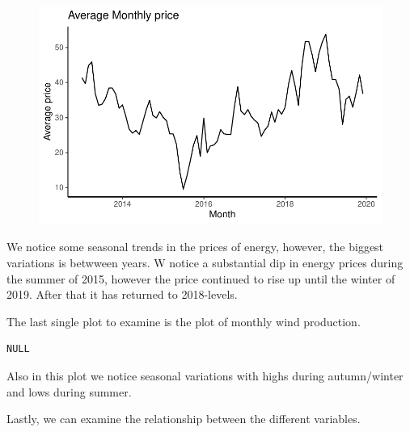 \documentclass[
  letterpaper,
  DIV=11,
  numbers=noendperiod]{scrartcl}
\newenvironment{Shaded}{\begin{snugshade}}{\end{snugshade}}
\newcommand{\CommentTok}[1]{\textcolor[rgb]{0.37,0.37,0.37}{#1}}
\newcommand{\NormalTok}[1]{\textcolor[rgb]{0.00,0.23,0.31}{#1}}
\newcommand{\SpecialCharTok}[1]{\textcolor[rgb]{0.37,0.37,0.37}{#1}}
\begin{document}
\begin{figure}[H]

{\centering \includegraphics{Assignment2_files/figure-pdf/unnamed-chunk-7-1.pdf}

}

\end{figure}

We notice some seasonal trends in the prices of energy, however, the
biggest variations is betwween years. W notice a substantial dip in
energy prices during the summer of 2015, however the price continued to
rise up until the winter of 2019. After that it has returned to
2018-levels.

The last single plot to examine is the plot of monthly wind production.

\begin{Shaded}
\end{Shaded}

\begin{verbatim}
NULL
\end{verbatim}

Also in this plot we notice seasonal variations with highs during
autumn/winter and lows during summer.

Lastly, we can examine the relationship between the different variables.
\end{document}
